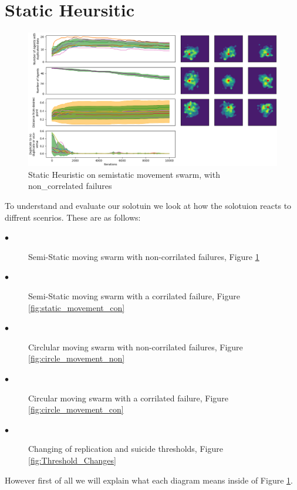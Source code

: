 \documentclass{UoYCSproject}
\begin{document}
\section{Static Heursitic}
\label{sec:Simple2a}

\begin{figure}[htb]
\label{fig:static_movement_non}
\begin{center}
\centering
\includegraphics[width=\linewidth]{"./Static_Heuristic/static_movement_non.png"}
\caption{Static Heuristic on semi\-static movement swarm, with non\_correlated failures}
\end{center}
\end{figure}

To understand and evaluate our solotuin we look at how the solotuion reacts to diffrent scenrios.
These are as follows:

\begin{description}
\item[$\bullet$] Semi-Static moving swarm with non-corrilated failures, Figure \ref{fig:static_movement_non}
\item[$\bullet$] Semi-Static moving swarm with a corrilated failure, Figure \ref{fig:static_movement_con}
\item[$\bullet$] Circlular moving swarm with non-corrilated failures, Figure \ref{fig:circle_movement_non}
\item[$\bullet$] Circular moving swarm with a corrilated failure, Figure \ref{fig:circle_movement_con}
\item[$\bullet$] Changing of replication and suicide thresholds, Figure \ref{fig:Threshold_Changes}
\end{description}

However first of all we will explain what each diagram means inside of Figure \ref{fig:static_movement_non}.
\end{document}

